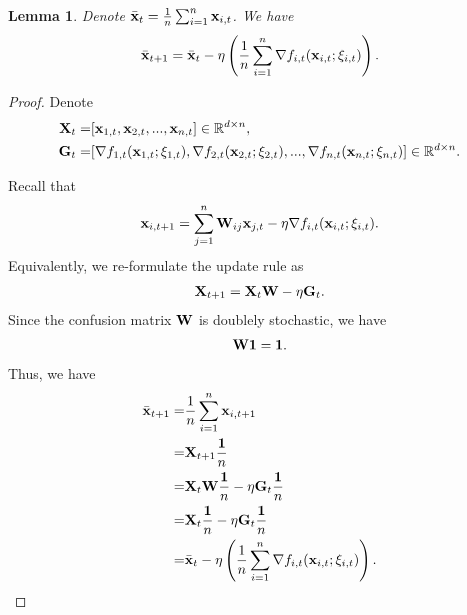 \documentclass{article}
\newtheorem{Lemma}{\bf{Lemma}}
\begin{document}
\begin{Lemma}
\label{lemma_average_update_rule}
Denote $\bar{{\bf x}}_t = \frac{1}{n}\sum_{i=1}^n {\bf x}_{i,t}$. We have
\begin{align}
\nonumber
\bar{{\bf x}}_{t+1} =  \bar{{\bf x}}_{t} - \eta \left( \frac{1}{n} \sum_{i=1}^n \nabla f_{i,t}({\bf x}_{i,t}; \xi_{i,t}) \right). 
\end{align}
\end{Lemma}
\begin{proof}
Denote 
\begin{align}
\nonumber
{\bf X}_t = &  [{\bf x}_{1,t}, {\bf x}_{2,t}, ..., {\bf x}_{n,t}] \in \mathbb{R}^{d\times n}, \\ \nonumber
{\bf G}_t = & [\nabla f_{1,t}({\bf x}_{1,t};\xi_{1,t}), \nabla f_{2,t}({\bf x}_{2,t};\xi_{2,t}), ..., \nabla f_{n,t}({\bf x}_{n,t};\xi_{n,t})] \in \mathbb{R}^{d\times n}.
\end{align}

Recall that 
\begin{align}
\nonumber
{\bf x}_{i,t+1} = \sum_{j=1}^n {\bf W}_{ij}{\bf x}_{j,t} - \eta \nabla f_{i,t}({\bf x}_{i,t};\xi_{i,t}).
\end{align} Equivalently, we re-formulate the update rule as
\begin{align}
\nonumber
{\bf X}_{t+1} = {\bf X}_{t}{\bf W} - \eta {\bf G}_t.
\end{align} Since the confusion matrix ${\bf W}$ is doublely stochastic, we have
\begin{align}
\nonumber
{\bf W} {\bf 1} = {\bf 1}.
\end{align} Thus, we have
\begin{align}
\nonumber
\bar{{\bf x}}_{t+1} = & \frac{1}{n}\sum_{i=1}^n {\bf x}_{i,t+1} \\ \nonumber
= & {\bf X}_{t+1}\frac{{\bf 1}}{n} \\ \nonumber 
= & {\bf X}_{t}{\bf W}\frac{{\bf 1}}{n} - \eta {\bf G}_t\frac{{\bf 1}}{n} \\ \nonumber
= & {\bf X}_{t}\frac{{\bf 1}}{n} - \eta {\bf G}_t\frac{{\bf 1}}{n} \\ \nonumber
=& \bar{{\bf x}}_{t} - \eta \left( \frac{1}{n} \sum_{i=1}^n \nabla f_{i,t}({\bf x}_{i,t}; \xi_{i,t}) \right). 
\end{align}
\end{proof}
\end{document}
